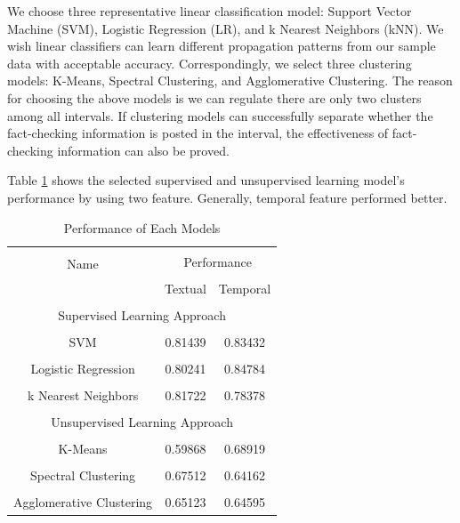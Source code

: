 \documentclass[conference]{IEEEtran}
\begin{document}
	We choose three representative linear classification model: Support Vector Machine (SVM), Logistic Regression (LR), and k Nearest Neighbors (kNN). We wish linear classifiers can learn different propagation patterns from our sample data with acceptable accuracy. Correspondingly, we select three clustering models: K-Means, Spectral Clustering, and Agglomerative Clustering. The reason for choosing the above models is we can regulate there are only two clusters among all intervals. If clustering models can successfully separate whether the fact-checking information is posted in the interval, the effectiveness of fact-checking information can also be proved. 
	
	Table \ref{tab1e:machinelearning} shows the selected supervised and unsupervised learning model's performance by using two feature. Generally, temporal feature performed better. 
	
	\begin{table}[htbp]
		\begin{center}
			\caption{Performance of Each Models}
			\begin{tabular}{|c|c|c|}
				\hline \\[-1em]
				\multirow{2}{*}{Name}    & \multicolumn{2}{|c|}{Performance} \\ \cline{2-3} \\[-1em]
				& Textual        & Temporal        \\ \hline \\[-1em]
				\multicolumn{3}{|c|}{Supervised Learning Approach}          \\ \hline \\[-1em]
				SVM                      & 0.81439        & 0.83432         \\ \hline \\[-1em]
				Logistic Regression      & 0.80241        & 0.84784         \\ \hline \\[-1em]
				k Nearest Neighbors      & 0.81722        & 0.78378         \\ \hhline{|=|=|=|} \\[-1em]
				\multicolumn{3}{|c|}{Unsupervised Learning Approach}        \\ \hline \\[-1em]
				K-Means                  & 0.59868        & 0.68919         \\ \hline \\[-1em]
				Spectral Clustering      & 0.67512        & 0.64162         \\ \hline \\[-1em]
				Agglomerative Clustering & 0.65123        & 0.64595         \\ \hline
			\end{tabular}
			\label{tab1e:machinelearning}
		\end{center}
	\end{table}
	
\end{document}
